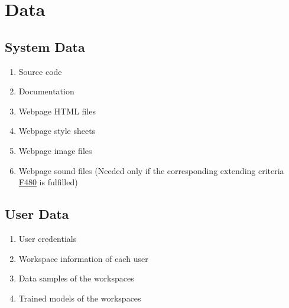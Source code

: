 \section{Data}
\subsection{System Data}
\begin{enumerate}[{label = \textbf{/D{\protect\twodigits{\arabic{enumi}}}0/}, leftmargin = *}]
    \item Source code
    \item Documentation
    \item Webpage HTML files
    \item Webpage style sheets
    \item Webpage image files
    \item Webpage sound files (Needed only if the corresponding extending criteria \hyperref[/F480/]{F480} is fulfilled)
\end{enumerate}

\subsection{User Data}
\begin{enumerate}[resume*]
    \item User credentials
    \item Workspace information of each user
    \item Data samples of the workspaces
    \item Trained models of the workspaces
\end{enumerate}
